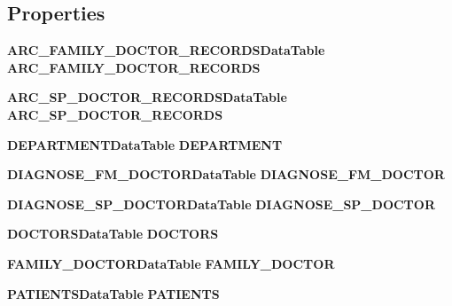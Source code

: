 \subsection*{Properties}
\begin{CompactItemize}
\item 
{\bf ARC\_\-FAMILY\_\-DOCTOR\_\-RECORDSDataTable} \textbf{ARC\_\-FAMILY\_\-DOCTOR\_\-RECORDS}\hspace{0.3cm}{\tt  [get]}\label{class_automatic_medical_system_1_1_data_set2_b53e8c511e5a3024856741b38dd067f6}

\item 
{\bf ARC\_\-SP\_\-DOCTOR\_\-RECORDSDataTable} \textbf{ARC\_\-SP\_\-DOCTOR\_\-RECORDS}\hspace{0.3cm}{\tt  [get]}\label{class_automatic_medical_system_1_1_data_set2_8844e50fc4e55d367ccfb13e016b0fe5}

\item 
{\bf DEPARTMENTDataTable} \textbf{DEPARTMENT}\hspace{0.3cm}{\tt  [get]}\label{class_automatic_medical_system_1_1_data_set2_7a3d0565eb2c20312dabeedb247298ba}

\item 
{\bf DIAGNOSE\_\-FM\_\-DOCTORDataTable} \textbf{DIAGNOSE\_\-FM\_\-DOCTOR}\hspace{0.3cm}{\tt  [get]}\label{class_automatic_medical_system_1_1_data_set2_f728b716f913af654be77c855ffc874e}

\item 
{\bf DIAGNOSE\_\-SP\_\-DOCTORDataTable} \textbf{DIAGNOSE\_\-SP\_\-DOCTOR}\hspace{0.3cm}{\tt  [get]}\label{class_automatic_medical_system_1_1_data_set2_21c1130ee21a9189bdd0b1e283adee06}

\item 
{\bf DOCTORSDataTable} \textbf{DOCTORS}\hspace{0.3cm}{\tt  [get]}\label{class_automatic_medical_system_1_1_data_set2_36e407b73b81cb271e88626c5f0e6c0e}

\item 
{\bf FAMILY\_\-DOCTORDataTable} \textbf{FAMILY\_\-DOCTOR}\hspace{0.3cm}{\tt  [get]}\label{class_automatic_medical_system_1_1_data_set2_1dcc1d5790c649ec9246bc0d9b3bb256}

\item 
{\bf PATIENTSDataTable} \textbf{PATIENTS}\hspace{0.3cm}{\tt  [get]}\label{class_automatic_medical_system_1_1_data_set2_33214de7081fede52e32f3513636a27f}


\end{CompactItemize}
